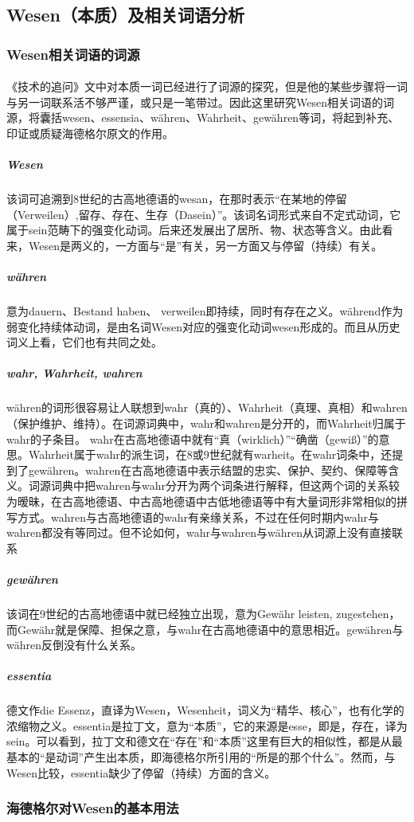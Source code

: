 \documentclass{article}
\begin{document}
	\subsection{Wesen（本质）及相关词语分析}
		\subsubsection{Wesen相关词语的词源}
			\paragraph{}
		《技术的追问》文中对本质一词已经进行了词源的探究，但是他的某些步骤将一词与另一词联系活不够严谨，或只是一笔带过。因此这里研究Wesen相关词语的词源，将囊括wesen、essensia、währen、Wahrheit、gewähren等词，将起到补充、印证或质疑海德格尔原文的作用。
			\subparagraph{Wesen}
			该词可追溯到8世纪的古高地德语的wesan，在那时表示“在某地的停留（Verweilen）,留存、存在、生存（Dasein）”。该词名词形式来自不定式动词，它属于sein范畴下的强变化动词。后来还发展出了居所、物、状态等含义。由此看来，Wesen是两义的，一方面与“是”有关，另一方面又与停留（持续）有关。
			\subparagraph{währen}意为dauern、Bestand haben、 verweilen即持续，同时有存在之义。während作为弱变化持续体动词，是由名词Wesen对应的强变化动词wesen形成的。而且从历史词义上看，它们也有共同之处。
			\subparagraph{wahr, Wahrheit, wahren}
			währen的词形很容易让人联想到wahr（真的）、Wahrheit（真理、真相）和wahren（保护维护、维持）。在词源词典中，wahr和wahren是分开的，而Wahrheit归属于wahr的子条目。
wahr在古高地德语中就有“真（wirklich）”“确凿（gewiß）”的意思。Wahrheit属于wahr的派生词，在8或9世纪就有warheit。在wahr词条中，还提到了gewähren。wahren在古高地德语中表示结盟的忠实、保护、契约、保障等含义。词源词典中把wahren与wahr分开为两个词条进行解释，但这两个词的关系较为暧昧，在古高地德语、中古高地德语中古低地德语等中有大量词形非常相似的拼写方式。wahren与古高地德语的wahr有亲缘关系，不过在任何时期内wahr与wahren都没有等同过。但不论如何，wahr与wahren与währen从词源上没有直接联系
			\subparagraph{gewähren}
			该词在9世纪的古高地德语中就已经独立出现，意为Gewähr leisten, zugestehen，而Gewähr就是保障、担保之意，与wahr在古高地德语中的意思相近。gewähren与währen反倒没有什么关系。
			\subparagraph{essentia}
			德文作die Essenz，直译为Wesen，Wesenheit，词义为“精华、核心”，也有化学的浓缩物之义。essentia是拉丁文，意为“本质”，它的来源是esse，即是，存在，译为sein。可以看到，拉丁文和德文在“存在”和“本质”这里有巨大的相似性，都是从最基本的“是动词”产生出本质，即海德格尔所引用的“所是的那个什么”。然而，与Wesen比较，essentia缺少了停留（持续）方面的含义。
		\subsubsection{海德格尔对Wesen的基本用法}
\end{document}
